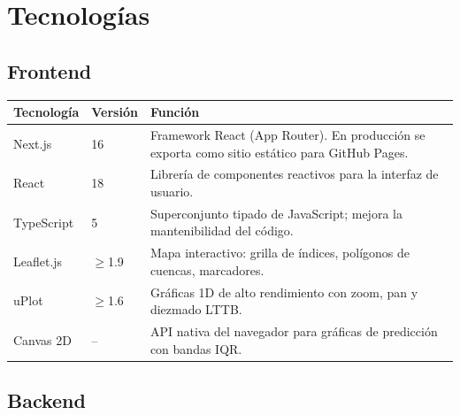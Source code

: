 \chapter{Tecnologías}
\label{ch:tecnologias}

\section{Frontend}
\label{sec:frontend_tech}

\begin{center}
\small
\begin{tabular}{@{}llp{5.8cm}@{}}
\toprule
\textbf{Tecnología} & \textbf{Versión} & \textbf{Función} \\
\midrule
Next.js      & 16       & Framework React (App Router). En producción se exporta como sitio estático para GitHub Pages. \\
React        & 18       & Librería de componentes reactivos para la interfaz de usuario. \\
TypeScript   & 5        & Superconjunto tipado de JavaScript; mejora la mantenibilidad del código. \\
Leaflet.js   & $\geq$1.9 & Mapa interactivo: grilla de índices, polígonos de cuencas, marcadores. \\
uPlot        & $\geq$1.6 & Gráficas 1D de alto rendimiento con zoom, pan y diezmado LTTB. \\
Canvas 2D    & --       & API nativa del navegador para gráficas de predicción con bandas IQR. \\
\bottomrule
\end{tabular}
\end{center}

\section{Backend}
\label{sec:backend_tech}

